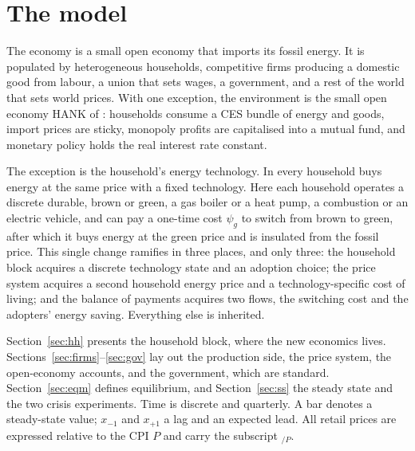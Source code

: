 
\section{The model}\label{sec:model}

The economy is a small open economy that imports its fossil energy. It is populated
by heterogeneous households, competitive firms producing a domestic good from
labour, a union that sets wages, a government, and a rest of the world that sets
world prices. With one exception, the environment is the small open economy HANK of
\citet{ARS2024}: households consume a CES bundle of energy and goods, import prices
are sticky, monopoly profits are capitalised into a mutual fund, and monetary policy
holds the real interest rate constant.

The exception is the household's energy technology. In \citet{ARS2024} every
household buys energy at the same price with a fixed technology. Here each household
operates a discrete durable, brown or green, a gas boiler or a heat pump, a
combustion or an electric vehicle, and can pay a one-time cost $\psi_g$ to switch
from brown to green, after which it buys energy at the green price and is insulated
from the fossil price. This single change ramifies in three places, and only three:
the household block acquires a discrete technology state and an adoption choice;
the price system acquires a second household energy price and a technology-specific
cost of living; and the balance of payments acquires two flows, the switching cost
and the adopters' energy saving. Everything else is inherited.

Section~\ref{sec:hh} presents the household block, where the new economics lives.
Sections~\ref{sec:firms}--\ref{sec:gov} lay out the production side, the price
system, the open-economy accounts, and the government, which are standard.
Section~\ref{sec:eqm} defines equilibrium, and Section~\ref{sec:ss} the steady
state and the two crisis experiments. Time is discrete and quarterly. A bar denotes
a steady-state value; $x_{-1}$ and $x_{+1}$ a lag and an expected lead. All retail
prices are expressed relative to the CPI $P$ and carry the subscript ${}_{/P}$.


